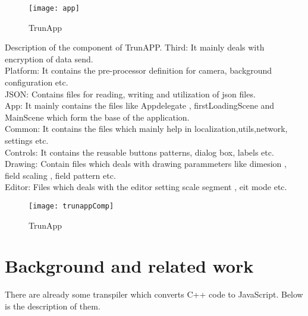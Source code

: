 \documentclass[23pt]{article}
\begin{document}
\begin{figure}[h]
\caption{TrunApp}
\centering
\texttt{[image: app]}
\end{figure}

{\Large Description of the component of TrunAPP.
Third: It mainly deals with encryption of data send.  \\  
Platform: It contains the pre-processor definition for camera, background configuration etc.\\
JSON: Contains files for  reading, writing and utilization of json files.\\
App: It mainly contains the files like Appdelegate , firstLoadingScene  and  MainScene which form the base of the application.\\
Common: It contains the files which mainly help in localization,utils,network, settings etc. \\
Controls: It contains the reusable buttons patterns, dialog box, labels etc. \\
Drawing: Contain files which deals with drawing parammeters like dimesion , field scaling , field pattern etc. \\
Editor: Files which deals with the editor setting scale segment , eit mode etc. \\ \par}

\begin{figure}[h]
\caption{TrunApp}
\centering
\texttt{[image: trunappComp]}
\end{figure}


\newpage

\section{Background and related work}
{\Large There are already some transpiler which converts C++ code to JavaScript. Below is the description of them.   \par }
\end{document}
